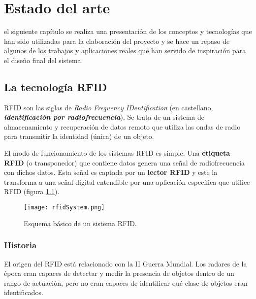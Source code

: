 
\chapter{Estado del arte}
\label{chap:antecedents}
 el siguiente capítulo se realiza una presentación de los conceptos
y tecnologías que han sido utilizadas para la elaboración del proyecto y se
hace un repaso de algunos de los trabajos y aplicaciones reales que han servido 
de inspiración para el diseño final del sistema.


  \section{La tecnología \acs{RFID}}
\acs{RFID} son las siglas de \emph{Radio Frequency IDentification} (en
castellano, \emph{\textbf{identificación por radiofrecuencia}}). Se trata de un
sistema de almacenamiento y recuperación de datos remoto que utiliza las ondas
de radio para transmitir la identidad (única) de un objeto.

El modo de funcionamiento de los sistemas \acs{RFID} es simple. Una
\textbf{etiqueta \acs{RFID}} (o transponedor) que contiene datos genera una
señal de radiofrecuencia con dichos datos. Esta señal es captada por un
\textbf{lector \acs{RFID}} y este la transforma a una señal digital entendible
por una aplicación específica que utilice \acs{RFID} (figura
\ref{fig:rfidSystem}).

\begin{figure}[!h]
  \begin{center}
    \texttt{[image: rfidSystem.png]}
    \caption{Esquema básico de un sistema \acs{RFID}.}
    \label{fig:rfidSystem}
  \end{center}
\end{figure}

    \subsection{Historia}
  El origen del \acs{RFID} está relacionado con la II Guerra Mundial. Los
  radares de la época eran capaces de detectar y medir la presencia de objetos
  dentro de un rango de actuación, pero no eran capaces de identificar qué
  clase de objetos eran identificados.

